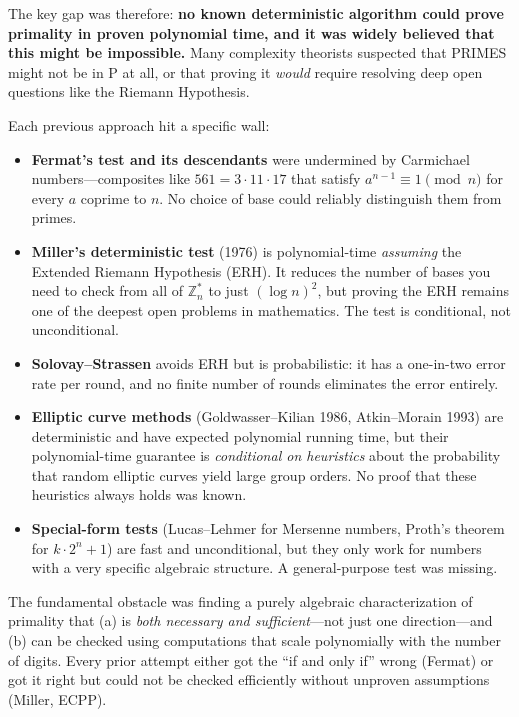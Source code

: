 The key gap was therefore: \textbf{no known deterministic algorithm could prove primality in proven polynomial time, and it was widely believed that this might be impossible.} Many complexity theorists suspected that PRIMES might not be in P at all, or that proving it \emph{would} require resolving deep open questions like the Riemann Hypothesis.

Each previous approach hit a specific wall:

\begin{itemize}
\item \textbf{Fermat's test and its descendants} were undermined by Carmichael numbers---composites like $561 = 3 \cdot 11 \cdot 17$ that satisfy $a^{n-1} \equiv 1 \pmod{n}$ for every $a$ coprime to $n$. No choice of base could reliably distinguish them from primes.
\item \textbf{Miller's deterministic test} (1976) is polynomial-time \emph{assuming} the Extended Riemann Hypothesis (ERH). It reduces the number of bases you need to check from all of $\mathbb{Z}_n^*$ to just $(\log n)^2$, but proving the ERH remains one of the deepest open problems in mathematics. The test is conditional, not unconditional.
\item \textbf{Solovay--Strassen} avoids ERH but is probabilistic: it has a one-in-two error rate per round, and no finite number of rounds eliminates the error entirely.
\item \textbf{Elliptic curve methods} (Goldwasser--Kilian 1986, Atkin--Morain 1993) are deterministic and have expected polynomial running time, but their polynomial-time guarantee is \emph{conditional on heuristics} about the probability that random elliptic curves yield large group orders. No proof that these heuristics always holds was known.
\item \textbf{Special-form tests} (Lucas--Lehmer for Mersenne numbers, Proth's theorem for $k \cdot 2^n + 1$) are fast and unconditional, but they only work for numbers with a very specific algebraic structure. A general-purpose test was missing.
\end{itemize}

The fundamental obstacle was finding a purely algebraic characterization of primality that (a) is \emph{both necessary and sufficient}---not just one direction---and (b) can be checked using computations that scale polynomially with the number of digits. Every prior attempt either got the ``if and only if'' wrong (Fermat) or got it right but could not be checked efficiently without unproven assumptions (Miller, ECPP).

